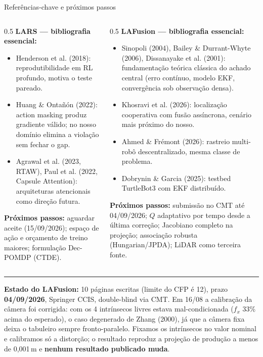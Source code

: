 \documentclass[aspectratio=169]{beamer}
\begin{document}
\begin{frame}{Referências-chave e próximos passos}
\begin{columns}[T]
\begin{column}{0.5\textwidth}
\textbf{LARS — bibliografia essencial:}
\tiny
\begin{itemize}
\item Henderson et al. (2018): reprodutibilidade em RL profundo, motiva o teste pareado.
\item Huang \& Ontañón (2022): action masking produz gradiente válido; no nosso domínio elimina a violação sem fechar o gap.
\item Agrawal et al. (2023, RTAW), Paul et al. (2022, Capsule Attention): arquiteturas atencionais como direção futura.
\end{itemize}
\vspace{0.1cm}
\textbf{Próximos passos:} aguardar aceite (15/09/2026); espaço de ação e orçamento de treino maiores; formulação Dec-POMDP (CTDE).
\end{column}
\begin{column}{0.5\textwidth}
\textbf{LAFusion — bibliografia essencial:}
\tiny
\begin{itemize}
\item Sinopoli (2004), Bailey \& Durrant-Whyte (2006), Dissanayake et al. (2001): fundamentação teórica clássica do achado central (erro contínuo, modelo EKF, convergência sob observação densa).
\item Khosravi et al. (2026): localização cooperativa com fusão assíncrona, cenário mais próximo do nosso.
\item Ahmed \& Frémont (2026): rastreio multi-robô descentralizado, mesma classe de problema.
\item Dobrynin \& Garcia (2025): testbed TurtleBot3 com EKF distribuído.
\end{itemize}
\vspace{0.1cm}
\textbf{Próximos passos:} submissão no CMT até 04/09/2026; $Q$ adaptativo por tempo desde a última correção; Jacobiano completo na projeção; associação robusta (Hungarian/JPDA); LiDAR como terceira fonte.
\end{column}
\end{columns}

\vspace{0.1cm}
\hrule
\vspace{0.1cm}
\tiny
\textbf{Estado do LAFusion:} 10 páginas escritas (limite do CFP é 12), prazo \textbf{04/09/2026}, Springer CCIS, double-blind via CMT. Em 16/08 a calibração da câmera foi corrigida: com os 4 intrínsecos livres estava mal-condicionada ($f_x$ 33\% acima do esperado), o caso degenerado de Zhang (2000), já que a câmera fixa deixa o tabuleiro sempre fronto-paralelo. Fixamos os intrínsecos no valor nominal e calibramos só a distorção; o resultado reproduz a projeção de produção a menos de 0,001\,m e \textbf{nenhum resultado publicado muda}.


\end{frame}
\end{document}
